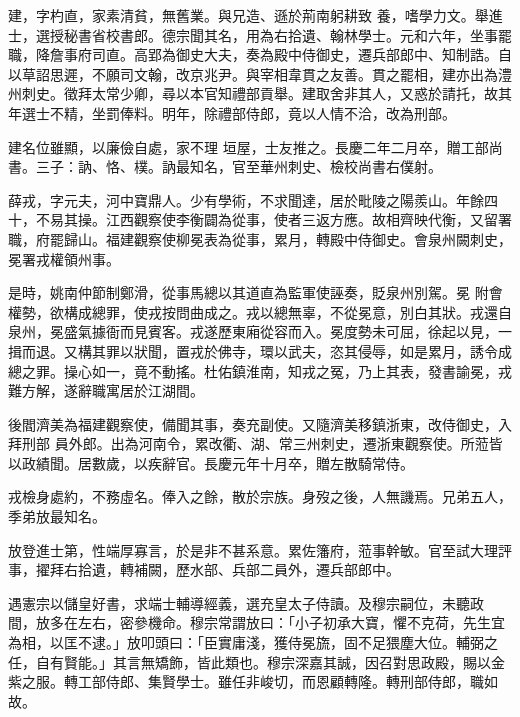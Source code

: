 \begin{pinyinscope}
 建，字杓直，家素清貧，無舊業。與兄造、遜於荊南躬耕致
 養，嗜學力文。舉進士，選授秘書省校書郎。德宗聞其名，用為右拾遺、翰林學士。元和六年，坐事罷職，降詹事府司直。高郢為御史大夫，奏為殿中侍御史，遷兵部郎中、知制誥。自以草詔思遲，不願司文翰，改京兆尹。與宰相韋貫之友善。貫之罷相，建亦出為澧州刺史。徵拜太常少卿，尋以本官知禮部貢舉。建取舍非其人，又惑於請托，故其年選士不精，坐罰俸料。明年，除禮部侍郎，竟以人情不洽，改為刑部。



 建名位雖顯，以廉儉自處，家不理
 垣屋，士友推之。長慶二年二月卒，贈工部尚書。三子：訥、恪、樸。訥最知名，官至華州刺史、檢校尚書右僕射。



 薛戎，字元夫，河中寶鼎人。少有學術，不求聞達，居於毗陵之陽羨山。年餘四十，不易其操。江西觀察使李衡闢為從事，使者三返方應。故相齊映代衡，又留署職，府罷歸山。福建觀察使柳冕表為從事，累月，轉殿中侍御史。會泉州闕刺史，冕署戎權領州事。



 是時，姚南仲節制鄭滑，從事馬總以其道直為監軍使誣奏，貶泉州別駕。冕
 附會權勢，欲構成總罪，使戎按問曲成之。戎以總無辜，不從冕意，別白其狀。戎還自泉州，冕盛氣據衙而見賓客。戎遂歷東廂從容而入。冕度勢未可屈，徐起以見，一揖而退。又構其罪以狀聞，置戎於佛寺，環以武夫，恣其侵辱，如是累月，誘令成總之罪。操心如一，竟不動搖。杜佑鎮淮南，知戎之冤，乃上其表，發書諭冕，戎難方解，遂辭職寓居於江湖間。



 後閻濟美為福建觀察使，備聞其事，奏充副使。又隨濟美移鎮浙東，改侍御史，入拜刑部
 員外郎。出為河南令，累改衢、湖、常三州刺史，遷浙東觀察使。所蒞皆以政績聞。居數歲，以疾辭官。長慶元年十月卒，贈左散騎常侍。



 戎檢身處約，不務虛名。俸入之餘，散於宗族。身歿之後，人無譏焉。兄弟五人，季弟放最知名。



 放登進士第，性端厚寡言，於是非不甚系意。累佐籓府，蒞事幹敏。官至試大理評事，擢拜右拾遺，轉補闕，歷水部、兵部二員外，遷兵部郎中。



 遇憲宗以儲皇好書，求端士輔導經義，選充皇太子侍讀。及穆宗嗣位，未聽政
 間，放多在左右，密參機命。穆宗常謂放曰：「小子初承大寶，懼不克荷，先生宜為相，以匡不逮。」放叩頭曰：「臣實庸淺，獲侍冕旒，固不足猥塵大位。輔弼之任，自有賢能。」其言無矯飾，皆此類也。穆宗深嘉其誠，因召對思政殿，賜以金紫之服。轉工部侍郎、集賢學士。雖任非峻切，而恩顧轉隆。轉刑部侍郎，職如故。




\end{pinyinscope}
